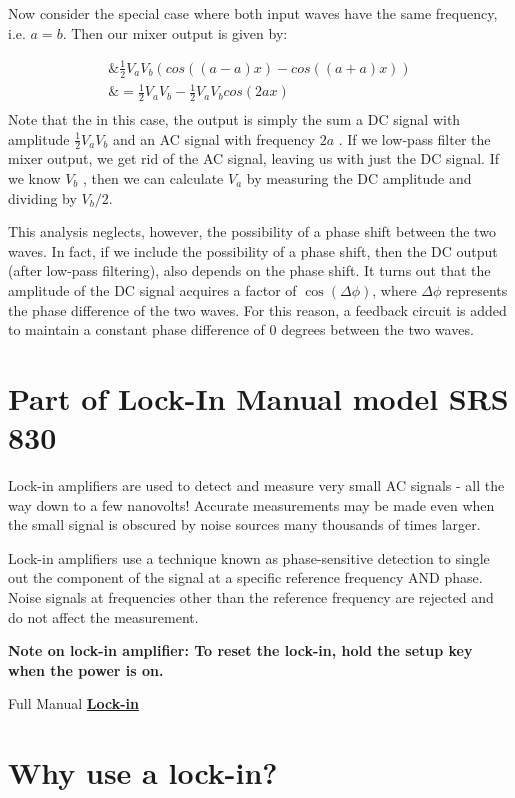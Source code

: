 \documentclass{../lab}
\begin{document}
Now consider the special case where both input waves have the same frequency, i.e.  ${a = b}$. Then our mixer output is given by:

\begin{align*} \&\frac{1}{2} V_{a} V_{b}(cos((a-a)x) - cos((a+a)x)) \\ \&= \frac{1}{2}V_{a}V_{b} - \frac{1}{2}V_{a}V_{b} cos(2ax) \\
\end{align*}
Note that the in this case, the output is simply the sum a DC signal with amplitude $\frac{1}{2} V_{a}V_{b}$ and an AC signal with frequency ${2a}$ . If we low-pass filter the mixer output, we get rid of the AC signal, leaving us with just the DC signal. If we know $V_{b}$ , then we can calculate $V_{a}$ by measuring the DC amplitude and dividing by $V_{b}/2$.

This analysis neglects, however, the possibility of a phase shift between the two waves. In fact, if we include the possibility of a phase shift, then the DC output (after low-pass filtering), also depends on the phase shift. It turns out that the amplitude of the DC signal acquires a factor of ${\cos(\Delta \phi) }$, where $\Delta \phi$ represents the phase difference of the two waves. For this reason, a feedback circuit is added to maintain a constant phase difference of 0 degrees between the two waves.

\section{Part of Lock-In Manual model SRS 830}

Lock-in amplifiers are used to detect and measure very small AC signals - all the way down to a few nanovolts! Accurate measurements may be made even when the small signal is obscured by noise sources many thousands of times larger.

Lock-in amplifiers use a technique known as phase-sensitive detection to single out the component of the signal at a specific reference frequency AND phase. Noise signals at frequencies other than the reference frequency are rejected and do not affect the measurement.

\textbf{Note on lock-in amplifier: To reset the lock-in, hold the setup key when the power is on.}

Full Manual \href{http://physics111.lib.berkeley.edu/Physics111/Equipment\_Manuals/SRS/SR830m.pdf}{\textbf{Lock-in}}

\section{Why use a lock-in?}
\end{document}
